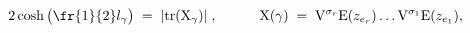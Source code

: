 \begin{equation}\label{fuchsgen}
2\cosh\big(\fr{1}{2}l_{\gamma}\big)\;=\;|{\rm tr}({\rm X}_{\gamma})|\;,
\quad\qquad
{\rm X}({\gamma})\;=\;{\rm V}^{\sigma_r}{\rm E}(z_{e_r})
\dots {\rm V}^{\sigma_1}
{\rm E}(z_{e_1}),
\end{equation}

